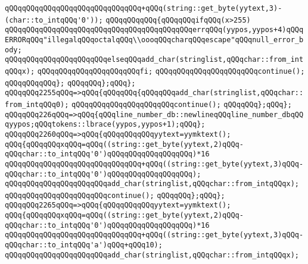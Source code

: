 \verb|qQQqqQQqqQQqqQQqqQQqqQQqqQQqqQQq+qQQq(string::get_byte(yytext,3)-(char::to_intqQQq'0'));|\newline
\verb|qQQqqQQqqQQq{qQQqqQQqifqQQq(x>255)|\newline
\verb|qQQqqQQqqQQqqQQqqQQqqQQqqQQqqQQqqQQqqQQqqQQqerrqQQq(yypos,yypos+4)qQQqERRORqQQq"illegalqQQqoctalqQQq\\oooqQQqcharqQQqescape"qQQqnull_error_body;|\newline
\verb|qQQqqQQqqQQqqQQqqQQqqQQqelseqQQqadd_char(stringlist,qQQqchar::from_intqQQqx);|\newline
\verb|qQQqqQQqqQQqqQQqqQQqqQQqfi;|\newline
\verb|qQQqqQQqqQQqqQQqqQQqqQQqcontinue();|\newline
\verb|qQQqqQQqqQQq};|\newline
\verb|qQQqqQQq};qQQq};|\newline
\verb|qQQqqQQq2255qQQq=>qQQq{qQQqqQQq{qQQqqQQqadd_char(stringlist,qQQqchar::from_intqQQq0);|\newline
\verb|qQQqqQQqqQQqqQQqqQQqqQQqcontinue();|\newline
\verb|qQQqqQQq};qQQq};|\newline
\verb|qQQqqQQq226qQQq=>qQQq{qQQqline_number_db::newlineqQQqline_number_dbqQQqyypos;qQQqtokens::lbrace(yypos,yypos+1);qQQq};|\newline
\verb|qQQqqQQq2260qQQq=>qQQq{qQQqqQQqqQQqyytext=yymktext();|\newline
\verb|qQQq{qQQqqQQqxqQQq=qQQq((string::get_byte(yytext,2)qQQq-qQQqchar::to_intqQQq'0')qQQqqQQqqQQqqQQqqQQq)*16|\newline
\verb|qQQqqQQqqQQqqQQqqQQqqQQqqQQqqQQq+qQQq((string::get_byte(yytext,3)qQQq-qQQqchar::to_intqQQq'0')qQQqqQQqqQQqqQQqqQQq);|\newline
\verb|qQQqqQQqqQQqqQQqqQQqqQQqadd_char(stringlist,qQQqchar::from_intqQQqx);|\newline
\verb|qQQqqQQqqQQqqQQqqQQqqQQqcontinue();|\newline
\verb|qQQqqQQq};qQQq};|\newline
\verb|qQQqqQQq2265qQQq=>qQQq{qQQqqQQqqQQqyytext=yymktext();|\newline
\verb|qQQq{qQQqqQQqxqQQq=qQQq((string::get_byte(yytext,2)qQQq-qQQqchar::to_intqQQq'0')qQQqqQQqqQQqqQQqqQQq)*16|\newline
\verb|qQQqqQQqqQQqqQQqqQQqqQQqqQQqqQQq+qQQq((string::get_byte(yytext,3)qQQq-qQQqchar::to_intqQQq'a')qQQq+qQQq10);|\newline
\verb|qQQqqQQqqQQqqQQqqQQqqQQqadd_char(stringlist,qQQqchar::from_intqQQqx);|\newline
